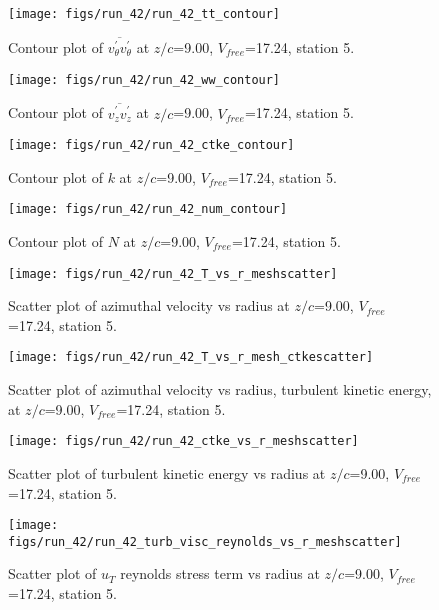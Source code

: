 \begin{figure}[H]
\centering
\texttt{[image: figs/run\_42/run\_42\_tt\_contour]}
\caption{Contour plot of $\overline{v_{\theta}^{\prime} v_{\theta}^{\prime}}$ at $z/c$=9.00, $V_{free}$=17.24, station 5.}
\end{figure}


\begin{figure}[H]
\centering
\texttt{[image: figs/run\_42/run\_42\_ww\_contour]}
\caption{Contour plot of $\overline{v_{z}^{\prime} v_{z}^{\prime}}$ at $z/c$=9.00, $V_{free}$=17.24, station 5.}
\end{figure}


\begin{figure}[H]
\centering
\texttt{[image: figs/run\_42/run\_42\_ctke\_contour]}
\caption{Contour plot of $k$ at $z/c$=9.00, $V_{free}$=17.24, station 5.}
\end{figure}


\begin{figure}[H]
\centering
\texttt{[image: figs/run\_42/run\_42\_num\_contour]}
\caption{Contour plot of $N$ at $z/c$=9.00, $V_{free}$=17.24, station 5.}
\end{figure}


\begin{figure}[H]
\centering
\texttt{[image: figs/run\_42/run\_42\_T\_vs\_r\_meshscatter]}
\caption{Scatter plot of azimuthal velocity vs radius at $z/c$=9.00, $V_{free}$=17.24, station 5.}
\end{figure}


\begin{figure}[H]
\centering
\texttt{[image: figs/run\_42/run\_42\_T\_vs\_r\_mesh\_ctkescatter]}
\caption{Scatter plot of azimuthal velocity vs radius, turbulent kinetic energy, at $z/c$=9.00, $V_{free}$=17.24, station 5.}
\end{figure}


\begin{figure}[H]
\centering
\texttt{[image: figs/run\_42/run\_42\_ctke\_vs\_r\_meshscatter]}
\caption{Scatter plot of turbulent kinetic energy vs radius at $z/c$=9.00, $V_{free}$=17.24, station 5.}
\end{figure}


\begin{figure}[H]
\centering
\texttt{[image: figs/run\_42/run\_42\_turb\_visc\_reynolds\_vs\_r\_meshscatter]}
\caption{Scatter plot of $
u_T$ reynolds stress term vs radius at $z/c$=9.00, $V_{free}$=17.24, station 5.}
\end{figure}


